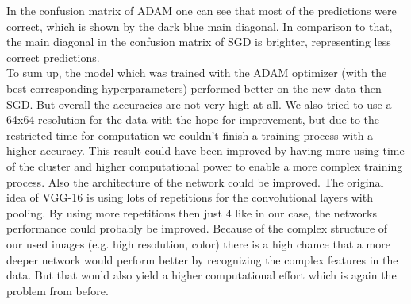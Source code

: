 \documentclass{tubaf-article}
\begin{document}
	In the confusion matrix of ADAM one can see that most of the predictions were correct, which is shown by the dark blue main diagonal. In comparison to that, the main diagonal in the confusion matrix of SGD is brighter, representing less correct predictions. \\
	To sum up, the model which was trained with the ADAM optimizer (with the best corresponding hyperparameters) performed better on the new data then SGD. But overall the accuracies are not very high at all. We also tried to use a 64x64 resolution for the data with the hope for improvement, but due to the restricted time for computation we couldn't finish a training process with a higher accuracy. This result could have been improved by having more using time of the cluster and higher computational power to enable a more complex training process. Also the architecture of the network could be improved. The original idea of VGG-16 is using lots of repetitions for the convolutional layers with pooling. By using more repetitions then just 4 like in our case, the networks performance could probably be improved. Because of the complex structure of our used images (e.g. high resolution, color) there is a high chance that a more deeper network would perform better by recognizing the complex features in the data. But that would also yield a higher computational effort which is again the problem from before. 
	
\end{document}
